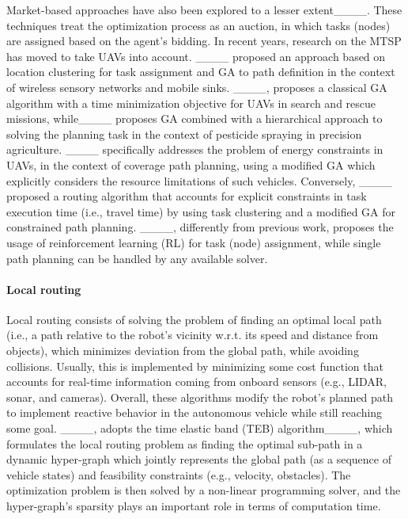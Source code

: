 Market-based approaches have also been explored to a lesser extent____. 
These techniques treat the optimization process as an auction, in which tasks (nodes) are assigned based on the agent's bidding. 
In recent years, research on the MTSP has moved to take UAVs into account.
____ proposed an approach based on location clustering for task assignment and GA to path definition in the context of wireless sensory networks and mobile sinks. 
____, proposes a classical GA algorithm with a time minimization objective for UAVs in search and rescue missions, while____ proposes GA combined with a hierarchical approach to solving the planning task in the context of pesticide spraying in precision agriculture.
____ specifically addresses the problem of energy constraints in UAVs, in the context of coverage path planning, using a modified GA which explicitly considers the resource limitations of such vehicles. 
Conversely, ____ proposed a routing algorithm that accounts for explicit constraints in task execution time (i.e., travel time) by using task clustering and a modified GA for constrained path planning. 
____, differently from previous work, proposes the usage of reinforcement learning (RL) for task (node) assignment, while single path planning can be handled by any available solver.  

\paragraph{Local routing}
Local routing consists of solving the problem of finding an optimal local path (i.e., a path relative to the robot's vicinity w.r.t. its speed and distance from objects), which minimizes deviation from the global path, while avoiding collisions. 
Usually, this is implemented by minimizing some cost function that accounts for real-time information coming from onboard sensors (e.g., LIDAR, sonar, and cameras).  
Overall, these algorithms modify the robot's planned path to implement reactive behavior in the autonomous vehicle while still reaching some goal.  
____, adopts the time elastic band (TEB) algorithm____, which formulates the local routing problem as finding the optimal sub-path in a dynamic hyper-graph which jointly represents the global path (as a sequence of vehicle states) and feasibility constraints (e.g., velocity, obstacles). 
The optimization problem is then solved by a non-linear programming solver, and the hyper-graph's sparsity plays an important role in terms of computation time.  

